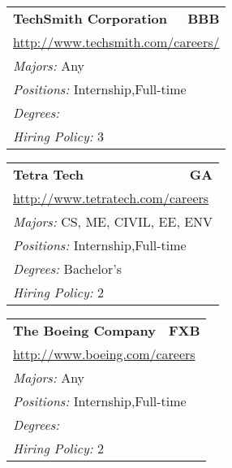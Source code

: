 \documentclass[twoside]{article}
\begin{document}
\begin{center}
\begin{multicols}{3}
\begin{FlushLeft}
\begin{minipage}{.9\columnwidth}
\end{minipage}
 
\begin{minipage}{.9\columnwidth}\begin{tabularx}{.95\columnwidth}{Xr}
                 {\Large\bf TechSmith Corporation} & {\Large\bf BBB}\\
    \multicolumn{2}{p{.95\columnwidth}}{\url{http://www.techsmith.com/careers/}}\\
    \multicolumn{2}{p{.95\columnwidth}}{\emph{Majors:} Any}\\
    \multicolumn{2}{p{.95\columnwidth}}{\emph{Positions:} Internship,Full-time}\\
    \multicolumn{2}{p{.95\columnwidth}}{\emph{Degrees:} }\\
    \multicolumn{2}{p{.95\columnwidth}}{\emph{Hiring Policy:} 3}\\
    \end{tabularx}
    
\end{minipage}
 
\begin{minipage}{.9\columnwidth}\begin{tabularx}{.95\columnwidth}{Xr}
                 {\Large\bf Tetra Tech} & {\Large\bf GA}\\
    \multicolumn{2}{p{.95\columnwidth}}{\url{http://www.tetratech.com/careers}}\\
    \multicolumn{2}{p{.95\columnwidth}}{\emph{Majors:} CS, ME, CIVIL, EE, ENV}\\
    \multicolumn{2}{p{.95\columnwidth}}{\emph{Positions:} Internship,Full-time}\\
    \multicolumn{2}{p{.95\columnwidth}}{\emph{Degrees:} Bachelor's}\\
    \multicolumn{2}{p{.95\columnwidth}}{\emph{Hiring Policy:} 2}\\
    \end{tabularx}
    
\end{minipage}
 
\begin{minipage}{.9\columnwidth}\begin{tabularx}{.95\columnwidth}{Xr}
                 {\Large\bf The Boeing Company} & {\Large\bf FXB}\\
    \multicolumn{2}{p{.95\columnwidth}}{\url{http://www.boeing.com/careers}}\\
    \multicolumn{2}{p{.95\columnwidth}}{\emph{Majors:} Any}\\
    \multicolumn{2}{p{.95\columnwidth}}{\emph{Positions:} Internship,Full-time}\\
    \multicolumn{2}{p{.95\columnwidth}}{\emph{Degrees:} }\\
    \multicolumn{2}{p{.95\columnwidth}}{\emph{Hiring Policy:} 2}\\
    \end{tabularx}
    

\end{minipage}
\end{FlushLeft}
\end{multicols}
\end{center}
\end{document}
